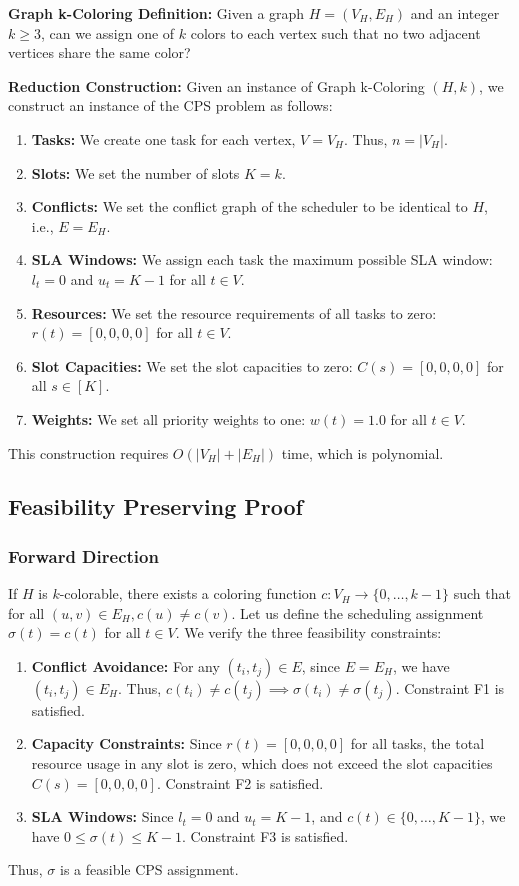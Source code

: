\documentclass[11pt,a4paper]{article}
\begin{document}
\textbf{Graph k-Coloring Definition:} Given a graph $H = (V_H, E_H)$ and an integer $k \ge 3$, can we assign one of $k$ colors to each vertex such that no two adjacent vertices share the same color?

\textbf{Reduction Construction:}
Given an instance of Graph k-Coloring $(H, k)$, we construct an instance of the CPS problem as follows:
\begin{enumerate}
    \item \textbf{Tasks:} We create one task for each vertex, $V = V_H$. Thus, $n = |V_H|$.
    \item \textbf{Slots:} We set the number of slots $K = k$.
    \item \textbf{Conflicts:} We set the conflict graph of the scheduler to be identical to $H$, i.e., $E = E_H$.
    \item \textbf{SLA Windows:} We assign each task the maximum possible SLA window: $l_t = 0$ and $u_t = K - 1$ for all $t \in V$.
    \item \textbf{Resources:} We set the resource requirements of all tasks to zero: $r(t) = [0, 0, 0, 0]$ for all $t \in V$.
    \item \textbf{Slot Capacities:} We set the slot capacities to zero: $C(s) = [0, 0, 0, 0]$ for all $s \in [K]$.
    \item \textbf{Weights:} We set all priority weights to one: $w(t) = 1.0$ for all $t \in V$.
\end{enumerate}
This construction requires $O(|V_H| + |E_H|)$ time, which is polynomial.

\subsection{Feasibility Preserving Proof}

\subsubsection{Forward Direction}
If $H$ is $k$-colorable, there exists a coloring function $c: V_H \to \{0, \dots, k-1\}$ such that for all $(u, v) \in E_H, c(u) \neq c(v)$.
Let us define the scheduling assignment $\sigma(t) = c(t)$ for all $t \in V$.
We verify the three feasibility constraints:
\begin{enumerate}
    \item \textbf{Conflict Avoidance:} For any $(t_i, t_j) \in E$, since $E = E_H$, we have $(t_i, t_j) \in E_H$. Thus, $c(t_i) \neq c(t_j) \implies \sigma(t_i) \neq \sigma(t_j)$. Constraint F1 is satisfied.
    \item \textbf{Capacity Constraints:} Since $r(t) = [0, 0, 0, 0]$ for all tasks, the total resource usage in any slot is zero, which does not exceed the slot capacities $C(s) = [0, 0, 0, 0]$. Constraint F2 is satisfied.
    \item \textbf{SLA Windows:} Since $l_t = 0$ and $u_t = K - 1$, and $c(t) \in \{0, \dots, K-1\}$, we have $0 \le \sigma(t) \le K - 1$. Constraint F3 is satisfied.
\end{enumerate}
Thus, $\sigma$ is a feasible CPS assignment.
\end{document}

